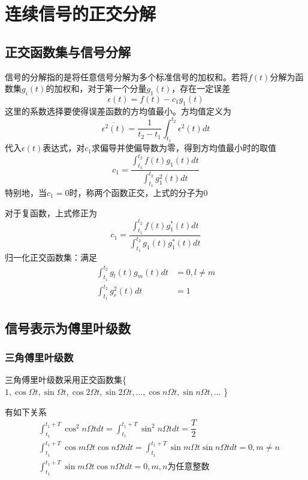 \chapter{连续信号的正交分解}
\section{正交函数集与信号分解}
信号的分解指的是将任意信号分解为多个标准信号的加权和。若将$f(t)$分解为函数集$g_i(t)$的加权和，对于第一个分量$g_1(t)$，存在一定误差
\begin{equation}
    \epsilon(t)=f(t)-c_1 g_1(t)
\end{equation}
这里的系数选择要使得误差函数的方均值最小。方均值定义为
\begin{equation}
    \overline{\epsilon ^2 (t)}=\dfrac{1}{t_2 -t_1}\int_{t_1}^{t_2}\epsilon^2(t)dt
\end{equation}
代入$\epsilon(t)$表达式，对$c_1$求偏导并使偏导数为零，得到方均值最小时的取值
\begin{equation}
    c_1=\dfrac{\int_{t_1}^{t_2}f(t)g_1(t)dt}{\int_{t_1}^{t_2}g_1^2(t)dt}
\end{equation}
特别地，当$c_1=0$时，称两个函数正交，上式的分子为0

对于复函数，上式修正为
\begin{equation}
    c_1=\dfrac{\int_{t_1}^{t_2}f(t)g_1^*(t)dt}{\int_{t_1}^{t_2}g_1(t)g_1^*(t)dt}
\end{equation}
归一化正交函数集：满足
\begin{align}
    \int_{t_1}^{t_2}g_l(t)g_m(t)dt&=0,l \ne m\\
    \int_{t_1}^{t_2}g_r^2(t)dt&=1
\end{align}
\section{信号表示为傅里叶级数}
\subsection{三角傅里叶级数}
三角傅里叶级数采用正交函数集\{$1,\cos \Omega t,\sin \Omega t, \cos 2\Omega t,\sin 2\Omega t,\dots,\cos n\Omega t,\sin n\Omega t,\dots$ \}

有如下关系
\begin{align}
    &\int_{t_1}^{t_1+T}\cos ^2 n\Omega t dt =\int_{t_1}^{t_1+T}\sin ^2 n\Omega t dt =\dfrac{T}{2}\\
    &\int_{t_1}^{t_1+T}\cos m\Omega t \cos n\Omega tdt=\int_{t_1}^{t_1+T}\sin m\Omega t \sin n\Omega tdt =0,m \ne n\\
    &\int_{t_1}^{t_1+T}\sin m\Omega t \cos n\Omega tdt=0,m,n\text{为任意整数}
\end{align}
{\color{red}{基本证明方法为和差化积，可以证明，移相后的三角函数之间往往不正交}}

